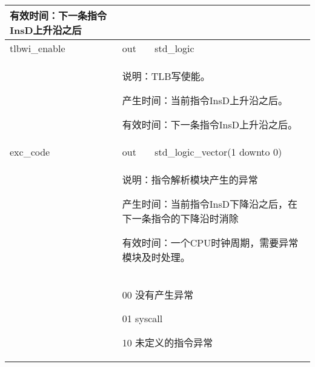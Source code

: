 \begin{tabularx}{\textwidth}{lll}
{                有效时间：下一条指令InsD上升沿之后 
            } \\
            \midrule
            tlbwi\_enable   & out       & std\_logic \\
            \cmidrule(l){2-3}
            &
            \multicolumn{2}{X}{
                说明：TLB写使能。

                产生时间：当前指令InsD上升沿之后。

                有效时间：下一条指令InsD上升沿之后。
            } \\
            \midrule
            exc\_code   & out       & std\_logic\_vector(1 downto 0) \\
            \cmidrule(l){2-3}
            &
            \multicolumn{2}{X}{
                说明：指令解析模块产生的异常

                产生时间：当前指令InsD下降沿之后，在下一条指令的下降沿时消除

                有效时间：一个CPU时钟周期，需要异常模块及时处理。
            } \\
            &
            \multicolumn{2}{X}{
                00 没有产生异常

                01 syscall

                10 未定义的指令异常
            } \\
            \bottomrule
            \end{tabularx}
